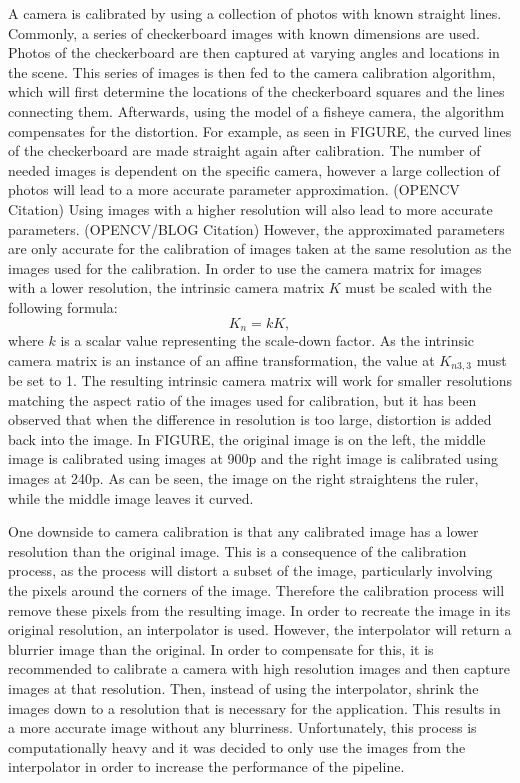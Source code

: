 \documentclass[arbeit=studie,oneside,BCOR=12mm]{ArbeitRST}
\begin{document}
A camera is calibrated by using a collection of photos with known straight
lines. Commonly, a series of checkerboard images with known dimensions are
used. Photos of the checkerboard are then captured at varying angles and
locations in the scene. This series of images is then fed to the camera
calibration algorithm, which will first determine the locations of the
checkerboard squares and the lines connecting them.  Afterwards, using the
model of a fisheye camera, the algorithm compensates for the distortion. For
example, as seen in FIGURE, the curved lines of the checkerboard are made
straight again after calibration. The number of needed images is dependent on
the specific camera, however a large collection of photos will lead to a more
accurate parameter approximation. (OPENCV Citation) Using images with a higher
resolution will also lead to more accurate parameters. (OPENCV/BLOG Citation)
However, the approximated parameters are only accurate for the calibration of
images taken at the same resolution as the images used for the calibration. In
order to use the camera matrix for images with a lower resolution, the
intrinsic camera matrix $K$ must be scaled with the following formula:
\begin{equation}
  K_n = k K,
\end{equation}
where $k$ is a scalar value representing the scale-down factor. As the
intrinsic camera matrix is an instance of an affine transformation, the value
at $K_{n3, 3}$ must be set to 1. The resulting intrinsic camera matrix will
work for smaller resolutions matching the aspect ratio of the images used for
calibration, but it has been observed that when the difference in resolution is
too large, distortion is added back into the image. In FIGURE, the original
image is on the left, the middle image is calibrated using images at 900p and
the right image is calibrated using images at 240p. As can be seen, the image
on the right straightens the ruler, while the middle image leaves it curved.

One downside to camera calibration is that any calibrated image has a lower
resolution than the original image. This is a consequence of the calibration
process, as the process will distort a subset of the image, particularly
involving the pixels around the corners of the image. Therefore the calibration
process will remove these pixels from the resulting image. In order to recreate
the image in its original resolution, an interpolator is used. However, the
interpolator will return a blurrier image than the original. In order to
compensate for this, it is recommended to calibrate a camera with high
resolution images and then capture images at that resolution. Then, instead of
using the interpolator, shrink the images down to a resolution that is
necessary for the application.  This results in a more accurate image without
any blurriness. Unfortunately, this process is computationally heavy and it was
decided to only use the images from the interpolator in order to increase the
performance of the pipeline.
\end{document}
